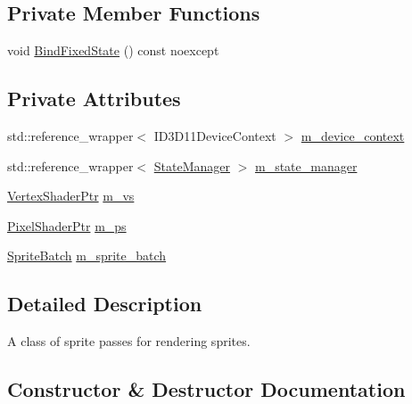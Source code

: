 \subsection*{Private Member Functions}
\begin{DoxyCompactItemize}
\item 
void \mbox{\hyperlink{classmage_1_1rendering_1_1_sprite_pass_a76d7ea36f7e24283411dc90686238136}{Bind\+Fixed\+State}} () const noexcept
\end{DoxyCompactItemize}
\subsection*{Private Attributes}
\begin{DoxyCompactItemize}
\item 
std\+::reference\+\_\+wrapper$<$ I\+D3\+D11\+Device\+Context $>$ \mbox{\hyperlink{classmage_1_1rendering_1_1_sprite_pass_a9e8435cadd9b3484d9845690204c5706}{m\+\_\+device\+\_\+context}}
\item 
std\+::reference\+\_\+wrapper$<$ \mbox{\hyperlink{classmage_1_1rendering_1_1_state_manager}{State\+Manager}} $>$ \mbox{\hyperlink{classmage_1_1rendering_1_1_sprite_pass_a60241eeab6141da050b1c61979894539}{m\+\_\+state\+\_\+manager}}
\item 
\mbox{\hyperlink{namespacemage_1_1rendering_aaf704b9c54a4181f4950a1761de69dda}{Vertex\+Shader\+Ptr}} \mbox{\hyperlink{classmage_1_1rendering_1_1_sprite_pass_a05c13379108ffa463958e8addabdcccf}{m\+\_\+vs}}
\item 
\mbox{\hyperlink{namespacemage_1_1rendering_af03d922b228ee9c8542baaa2ecc9f259}{Pixel\+Shader\+Ptr}} \mbox{\hyperlink{classmage_1_1rendering_1_1_sprite_pass_aac258f752dde77f0e428b8d8725b8e66}{m\+\_\+ps}}
\item 
\mbox{\hyperlink{classmage_1_1rendering_1_1_sprite_batch}{Sprite\+Batch}} \mbox{\hyperlink{classmage_1_1rendering_1_1_sprite_pass_a458633552d664181db78adb6c52a5f22}{m\+\_\+sprite\+\_\+batch}}
\end{DoxyCompactItemize}


\subsection{Detailed Description}
A class of sprite passes for rendering sprites. 

\subsection{Constructor \& Destructor Documentation}
\mbox{\label{classmage_1_1rendering_1_1_sprite_pass_ae247bfa4b2b13a874e080d53e271e974}} 
